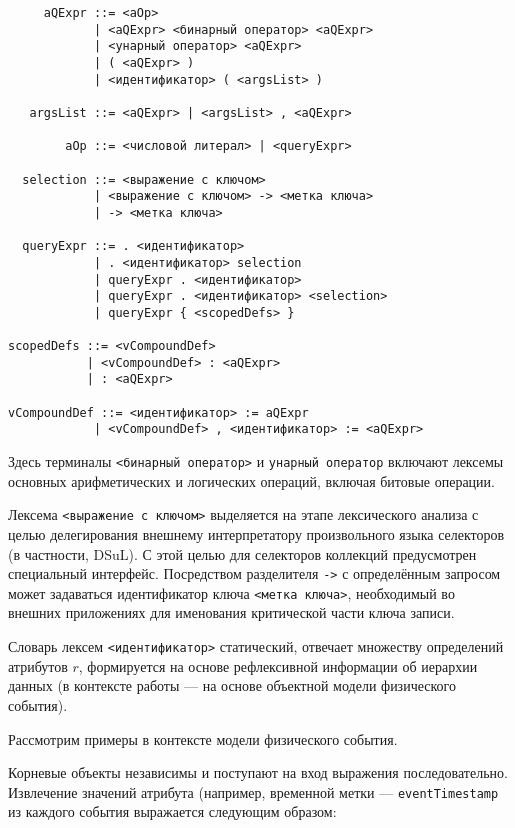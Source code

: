 \begin{verbatim}
     aQExpr ::= <aOp>
            | <aQExpr> <бинарный оператор> <aQExpr>
            | <унарный оператор> <aQExpr>
            | ( <aQExpr> )
            | <идентификатор> ( <argsList> )

   argsList ::= <aQExpr> | <argsList> , <aQExpr>

        aOp ::= <числовой литерал> | <queryExpr>

  selection ::= <выражение с ключом>
            | <выражение с ключом> -> <метка ключа>
            | -> <метка ключа>

  queryExpr ::= . <идентификатор>
            | . <идентификатор> selection
            | queryExpr . <идентификатор>
            | queryExpr . <идентификатор> <selection>
            | queryExpr { <scopedDefs> }

scopedDefs ::= <vCompoundDef>
           | <vCompoundDef> : <aQExpr>
           | : <aQExpr>

vCompoundDef ::= <идентификатор> := aQExpr 
            | <vCompoundDef> , <идентификатор> := <aQExpr>
\end{verbatim}

Здесь терминалы \texttt{<бинарный оператор>} и \texttt{унарный оператор}
включают лексемы основных арифметических и логических операций, включая битовые
операции. %

Лексема \texttt{<выражение с ключом>} %
выделяется на этапе лексического анализа с целью делегирования внешнему
интерпретатору произвольного языка селекторов (в частности, DSuL).
С этой целью для селекторов коллекций предусмотрен специальный интерфейс.
Посредством разделителя \texttt{->} с определённым запросом может задаваться
идентификатор ключа \texttt{<метка ключа>}, необходимый во внешних
приложениях для именования критической части ключа записи.

Словарь лексем \texttt{<идентификатор>} статический, отвечает множеству
определений атрибутов $r$, формируется на основе рефлексивной информации об
иерархии данных (в контексте работы --- на основе объектной модели физического
события).

Рассмотрим примеры в контексте модели физического события.

Корневые объекты независимы и поступают
на вход выражения последовательно. Извлечение значений атрибута
(например, временной метки --- \texttt{eventTimestamp} из каждого события
выражается следующим образом:

